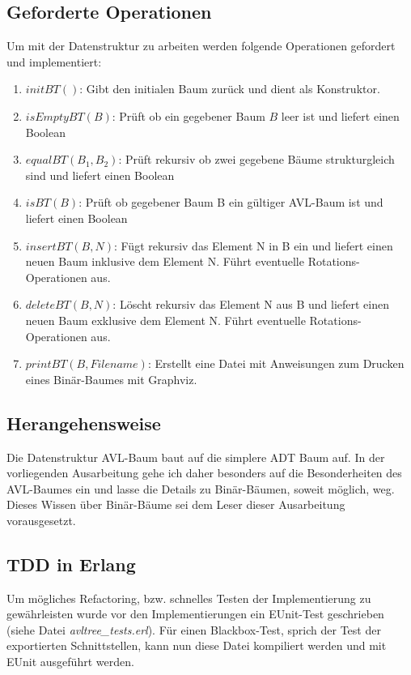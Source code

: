 \documentclass{article}
\begin{document}
	\subsection{Geforderte Operationen}
	
	Um mit der Datenstruktur zu arbeiten werden folgende Operationen gefordert und implementiert:
	
	\begin{enumerate}
		\item $initBT()$: Gibt den initialen Baum zurück und dient als Konstruktor.
		\item $isEmptyBT(B)$: Prüft ob ein gegebener Baum $B$ leer ist und liefert einen Boolean
		\item $equalBT(B_1, B_2)$: Prüft rekursiv ob zwei gegebene Bäume strukturgleich sind und liefert einen Boolean
		\item $isBT(B)$: Prüft ob gegebener Baum B ein gültiger AVL-Baum ist und liefert einen Boolean
		\item $insertBT(B, N)$: Fügt rekursiv das Element N in B ein und liefert einen neuen Baum inklusive dem Element N. Führt eventuelle Rotations-Operationen aus.
		\item $deleteBT(B, N)$: Löscht rekursiv das Element N aus B und liefert einen neuen Baum exklusive dem Element N. Führt eventuelle Rotations-Operationen aus.
		\item $printBT(B, Filename)$: Erstellt eine Datei mit Anweisungen zum Drucken eines Binär-Baumes mit Graphviz. 
	\end{enumerate}
	
	\subsection{Herangehensweise}
	
	Die Datenstruktur AVL-Baum baut auf die simplere ADT Baum auf. In der vorliegenden Ausarbeitung gehe ich daher besonders auf die Besonderheiten des AVL-Baumes ein und lasse die Details zu Binär-Bäumen, soweit möglich, weg. Dieses Wissen über Binär-Bäume sei dem Leser dieser Ausarbeitung vorausgesetzt.

  
  \subsection{TDD in Erlang}
  
  Um mögliches Refactoring, bzw. schnelles Testen der Implementierung zu gewährleisten wurde vor den Implementierungen ein EUnit-Test geschrieben (siehe Datei \textit{avltree\_tests.erl}). Für einen Blackbox-Test, sprich der Test der exportierten Schnittstellen, kann nun diese Datei kompiliert werden und mit EUnit ausgeführt werden.
  
\end{document}

